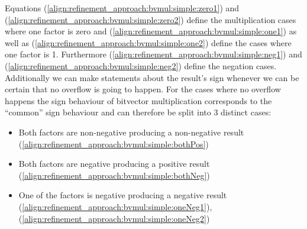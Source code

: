 Equations (\ref{align:refinement_approach:bvmul:simple:zero1}) and (\ref{align:refinement_approach:bvmul:simple:zero2}) define the multiplication cases where one factor is zero and (\ref{align:refinement_approach:bvmul:simple:one1}) as well as (\ref{align:refinement_approach:bvmul:simple:one2}) define the cases where one factor is 1. Furthermore (\ref{align:refinement_approach:bvmul:simple:neg1}) and (\ref{align:refinement_approach:bvmul:simple:neg2}) define the negation cases.\\
Additionally we can make statements about the result's sign whenever we can be certain that no overflow is going to happen. For the cases where no overflow happens the sign behaviour of bitvector multiplication corresponds to the \enquote{common} sign behaviour and can therefore be split into 3 distinct cases:
\begin{itemize}
    \item Both factors are non-negative producing a non-negative result (\ref{align:refinement_approach:bvmul:simple:bothPos})
    \item Both factors are negative producing a positive result
    (\ref{align:refinement_approach:bvmul:simple:bothNeg})
    \item One of the factors is negative producing a negative result (\ref{align:refinement_approach:bvmul:simple:oneNeg1}), (\ref{align:refinement_approach:bvmul:simple:oneNeg2})
\end{itemize}{}

